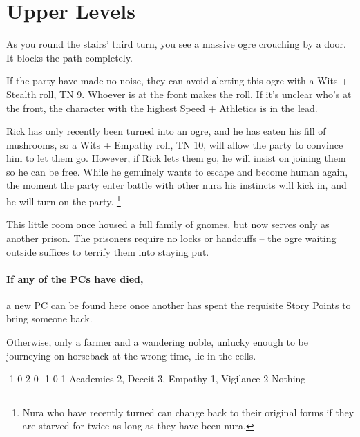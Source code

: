 \section{Upper Levels}

\begin{multicols}{2}


\begin{boxtext}

	As you round the stairs' third turn, you see a massive ogre crouching by a door.
	It blocks the path completely.

\end{boxtext}

If the party have made no noise, they can avoid alerting this ogre with a Wits + Stealth roll, TN 9.
Whoever is at the front makes the roll.
If it's unclear who's at the front, the character with the highest Speed + Athletics is in the lead.


Rick has only recently been turned into an ogre, and he has eaten his fill of mushrooms, so a Wits + Empathy roll, TN 10, will allow the party to convince him to let them go.
However, if Rick lets them go, he will insist on joining them so he can be free.
While he genuinely wants to escape and become human again, the moment the party enter battle with other nura his instincts will kick in, and he will turn on the party.%
\footnote{Nura who have recently turned can change back to their original forms if they are starved for twice as long as they have been nura.}


This little room once housed a full family of gnomes, but now serves only as another prison.
The prisoners require no locks or handcuffs -- the ogre waiting outside suffices to terrify them into staying put.

\paragraph{If any of the PCs have died,}
a new PC can be found here once another has spent the requisite Story Points to bring someone back.

Otherwise, only a farmer and a wandering noble, unlucky enough to be journeying on horseback at the wrong time, lie in the cells.

{-1}%
{0}%
{{2}%
{0}%
{-1}}%
{0}%
{1}%
{Academics 2, Deceit 3, Empathy 1, Vigilance 2}%
{Nothing}%
{}


\end{multicols}
